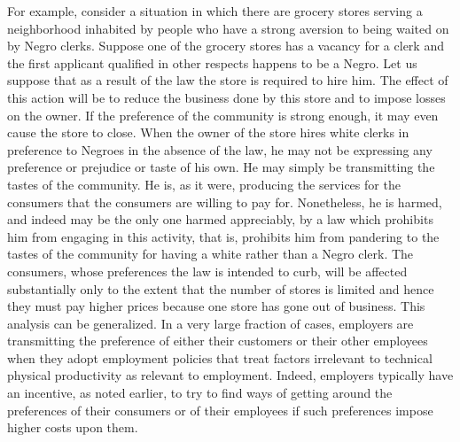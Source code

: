 \documentclass[11pt,openany]{book}
\begin{document}
For example, consider a situation in which there are grocery stores serving a neighborhood inhabited by people who have a strong aversion to being waited on by Negro clerks. Suppose one of the grocery stores has a vacancy for a clerk and the first applicant qualified in other respects happens to be a Negro. Let us suppose that as a result of the law the store is required to hire him. The effect of this action will be to reduce the business done by this store and to impose losses on the owner. If the preference of the community is strong enough, it may even cause the store to close. When the owner of the store hires white clerks in preference to Negroes in the absence of the law, he may not be expressing any preference or prejudice or taste of his own. He may simply be transmitting the tastes of the community. He is, as it were, producing the services for the consumers that the consumers are willing to pay for. Nonetheless, he is harmed, and indeed may be the only one harmed appreciably, by a law which prohibits him from engaging in this activity, that is, prohibits him from pandering to the tastes of the community for having a white rather than a Negro clerk. The consumers, whose preferences the law is intended to curb, will be affected substantially only to the extent that the number of stores is limited and hence they must pay higher prices because one store has gone out of business. This analysis can be generalized. In a very large fraction of cases, employers are transmitting the preference of either their customers or their other employees when they adopt employment policies that treat factors irrelevant to technical physical productivity as relevant to employment. Indeed, employers typically have an incentive, as noted earlier, to try to find ways of getting around the preferences of their consumers or of their employees if such preferences impose higher costs upon them.
\end{document}
